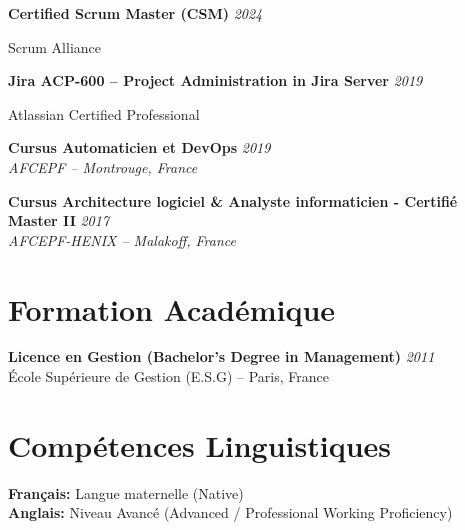 \documentclass[11pt,a4paper]{article}
\begin{document}
\textbf{Certified Scrum Master (CSM)} \hfill \textit{2024}

Scrum Alliance

\textbf{Jira ACP-600 -- Project Administration in Jira Server} \hfill \textit{2019}

Atlassian Certified Professional

\textbf{Cursus Automaticien et DevOps} \hfill \textit{2019}\\
\textit{AFCEPF -- Montrouge, France}

\textbf{Cursus Architecture logiciel \& Analyste informaticien - Certifié Master II} \hfill \textit{2017}\\
\textit{AFCEPF-HENIX -- Malakoff, France}

\section*{Formation Académique}

\textbf{Licence en Gestion (Bachelor's Degree in Management)} \hfill \textit{2011}\\
École Supérieure de Gestion (E.S.G) -- Paris, France

\section*{Compétences Linguistiques}

\textbf{Français:} Langue maternelle (Native)\\
\textbf{Anglais:} Niveau Avancé (Advanced / Professional Working Proficiency)
\end{document}
